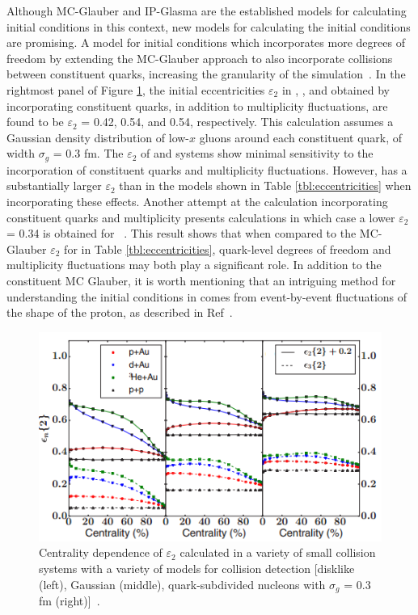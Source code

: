 Although MC-Glauber and IP-Glasma are the established models for calculating initial conditions in this context, new models for calculating the initial conditions are promising. A model for initial conditions which incorporates more degrees of freedom by extending the MC-Glauber approach to also incorporate collisions between constituent quarks, increasing the granularity of the simulation~\cite{PhysRevC.67.064905}. In the rightmost panel of Figure \ref{fig:epsilon_2_theory}, the initial eccentricities $\varepsilon_2$ in \pau, \dau, and \hau obtained by incorporating constituent quarks, in addition to multiplicity fluctuations, are found to be $\varepsilon_2$ = 0.42, 0.54, and 0.54, respectively. This calculation assumes a Gaussian density distribution of low-$x$ gluons around each constituent quark, of width $\sigma_g$ = 0.3 fm. The $\varepsilon_2$ of \dau and \hau systems show minimal sensitivity to the incorporation of constituent quarks and multiplicity fluctuations. However, \pau has a substantially larger $\varepsilon_2$ than in the models shown in Table \ref{tbl:eccentricities} when incorporating these effects. Another attempt at the calculation incorporating constituent quarks and multiplicity presents calculations in which case a lower $\varepsilon_2$ = 0.34 is obtained for \pau ~\cite{PhysRevC.94.024919}. This result shows that when compared to the MC-Glauber $\varepsilon_2$ for \pau in Table \ref{tbl:eccentricities}, quark-level degrees of freedom and multiplicity fluctuations may both play a significant role. In addition to the constituent MC Glauber, it is worth mentioning that an intriguing method for understanding the initial conditions in \pau comes from event-by-event fluctuations of the shape of the proton, as described in Ref~\cite{Schlichting2014313}. 

\begin{figure}[!ht]
\begin{center}
\includegraphics[width=0.65\linewidth]{figs/theoretical_epsilon_values.png}
\caption{Centrality dependence of $\varepsilon_2$ calculated in a variety of small collision systems with a variety of models for collision detection [disklike (left), Gaussian (middle), quark-subdivided nucleons with $\sigma_g$ = 0.3 fm (right)]~\cite{PhysRevC.94.024919}.}
\label{fig:epsilon_2_theory}
\end{center}
\end{figure}

